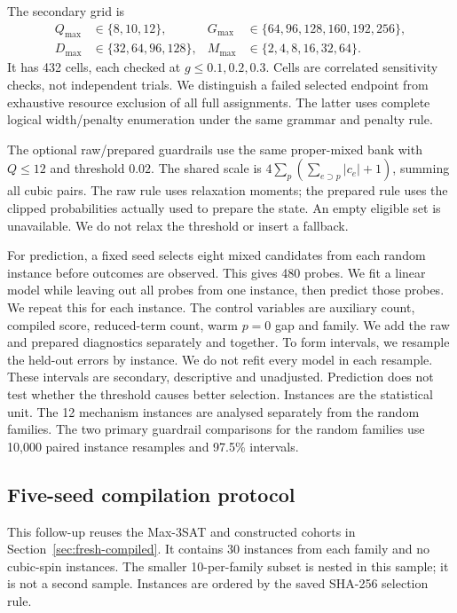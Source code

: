\documentclass[a4paper,onecolumn,11pt,unpublished]{quantumarticle}
\theoremstyle{remark}
\begin{document}
The secondary grid is
\[
\begin{aligned}
Q_{\max}&\in\{8,10,12\},&G_{\max}&\in\{64,96,128,160,192,256\},\\
D_{\max}&\in\{32,64,96,128\},&M_{\max}&\in\{2,4,8,16,32,64\}.
\end{aligned}
\]
It has 432 cells, each checked at $g\leq0.1,0.2,0.3$.
Cells are correlated sensitivity checks, not independent trials.
We distinguish a failed selected endpoint from exhaustive resource exclusion
of all full assignments. The latter uses complete logical width/penalty
enumeration under the same grammar and penalty rule.

The optional raw/prepared guardrails use the same proper-mixed bank with
$Q\leq12$ and threshold $0.02$. The shared scale is
$4\sum_{p}(\sum_{e\supset p}|c_e|+1)$, summing all cubic pairs.
The raw rule uses relaxation moments; the prepared rule uses the clipped
probabilities actually used to prepare the state. An empty eligible set
is unavailable. We do not relax the threshold or insert a fallback.

For prediction, a fixed seed selects eight mixed candidates from each random
instance before outcomes are observed. This gives 480 probes. We fit a linear
model while leaving out all probes from one instance, then predict those
probes. We repeat this for each instance. The control variables are auxiliary
count, compiled score, reduced-term count, warm $p=0$ gap and family.
We add the raw and prepared diagnostics separately and together.
To form intervals, we resample the held-out errors by instance. We do not
refit every model in each resample. These intervals are secondary,
descriptive and unadjusted. Prediction does not test whether the threshold
causes better selection. Instances are the statistical unit. The 12 mechanism
instances are analysed separately from the random families. The two primary
guardrail comparisons for the random families use 10,000 paired instance
resamples and 97.5\% intervals.


\subsection{Five-seed compilation protocol}
\label{sec:multiseed-methods}
This follow-up reuses the Max-3SAT and constructed cohorts in
Section~\ref{sec:fresh-compiled}. It contains 30 instances from each
family and no cubic-spin instances. The smaller 10-per-family subset is
nested in this sample; it is not a second sample. Instances are ordered
by the saved SHA-256 selection rule.
\end{document}
